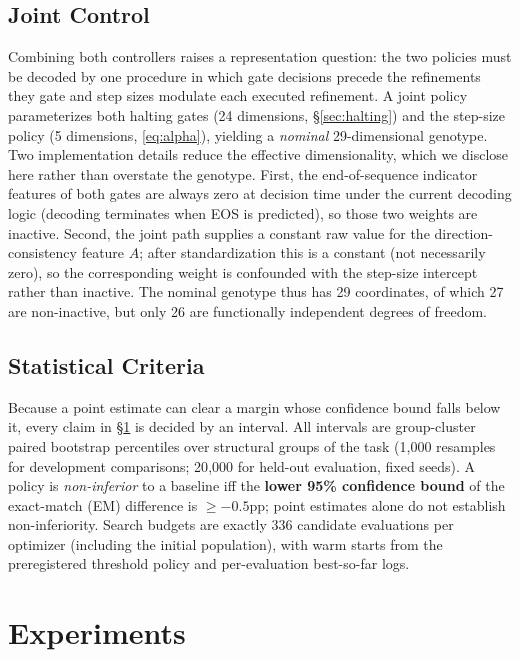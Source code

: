 \documentclass[11pt]{article}
\begin{document}
\subsection{Joint Control}
Combining both controllers raises a representation question: the two policies must be decoded by one procedure in which gate decisions precede the refinements they gate and step sizes modulate each executed refinement. A joint policy parameterizes both halting gates (24 dimensions, \S\ref{sec:halting}) and the step-size policy (5 dimensions, \eqref{eq:alpha}), yielding a \emph{nominal} 29-dimensional genotype. Two implementation details reduce the effective dimensionality, which we disclose here rather than overstate the genotype. First, the end-of-sequence indicator features of both gates are always zero at decision time under the current decoding logic (decoding terminates when EOS is predicted), so those two weights are inactive. Second, the joint path supplies a constant raw value for the direction-consistency feature $A$; after standardization this is a constant (not necessarily zero), so the corresponding weight is confounded with the step-size intercept rather than inactive. The nominal genotype thus has 29 coordinates, of which 27 are non-inactive, but only 26 are functionally independent degrees of freedom.

\subsection{Statistical Criteria}
\label{sec:stats}
Because a point estimate can clear a margin whose confidence bound falls below it, every claim in \S\ref{sec:experiments} is decided by an interval. All intervals are group-cluster paired bootstrap percentiles \citep{cameron2015practitioner} over structural groups of the task (1{,}000 resamples for development comparisons; 20{,}000 for held-out evaluation, fixed seeds). A policy is \emph{non-inferior} to a baseline iff the \textbf{lower 95\% confidence bound} of the exact-match (EM) difference is $\geq -0.5$pp; point estimates alone do not establish non-inferiority. Search budgets are exactly 336 candidate evaluations per optimizer (including the initial population), with warm starts from the preregistered threshold policy and per-evaluation best-so-far logs.

\section{Experiments}
\label{sec:experiments}
\end{document}
